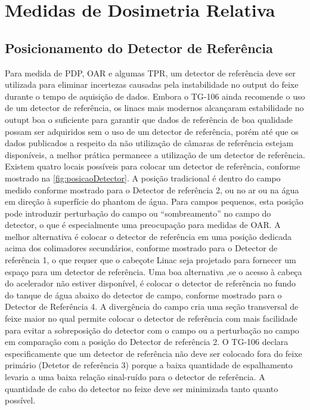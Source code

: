 \documentclass[11pt,a4paper]{article}
\begin{document}
\section{Medidas de Dosimetria Relativa}

\subsection*{Posicionamento do Detector de Referência}

	Para medida de PDP, OAR e algumas TPR, um detector de referência deve ser utilizada para eliminar incertezas causadas pela instabilidade no output do feixe durante o tempo de aquisição de dados. Embora o TG-106 ainda recomende o uso de um detector de referência, os linacs mais modernos alcançaram estabilidade no outupt boa o suficiente para garantir que  dados de referência de boa qualidade possam ser adquiridos sem o uso de um detector de referência, porém até que os dados publicados a respeito da não utilização de câmaras de referência estejam disponíveis, a melhor prática permanece a utilização de um detector de referência. Existem quatro locais possíveis para colocar um detector de referência, conforme mostrado na \ref{fig:posicaoDetector}. A posição tradicional é dentro do campo medido conforme mostrado para o Detector de referência 2, ou no ar ou na água em direção à superfície do phantom de água. Para campos pequenos, esta posição pode introduzir perturbação do campo ou ``sombreamento'' no campo do detector, o que é especialmente uma preocupação para medidas de OAR. A melhor alternativa é colocar o detector de referência em uma posição dedicada acima dos colimadores secundários, conforme mostrado para o Detector de referência 1, o que requer que o cabeçote Linac seja projetado para fornecer um espaço para um detector de referência. Uma boa alternativa ,se o acesso à cabeça do acelerador não estiver disponível, é colocar o detector de referência no fundo do tanque de água abaixo do detector de campo, conforme mostrado para o Detector de Referência 4. A divergência do campo cria uma seção transversal de feixe maior no qual permite colocar o detector de referência com mais facilidade para evitar a sobreposição do detector com o campo ou a perturbação no campo em comparação com a posição do Detector de referência 2. O TG-106 declara especificamente que um detector de referência não deve ser colocado fora do feixe primário (Detetor de referência 3) porque a baixa quantidade de espalhamento levaria a uma baixa relação sinal-ruído para o detector de referência. A quantidade de cabo do detector no feixe deve ser minimizada tanto quanto possível.
\end{document}
